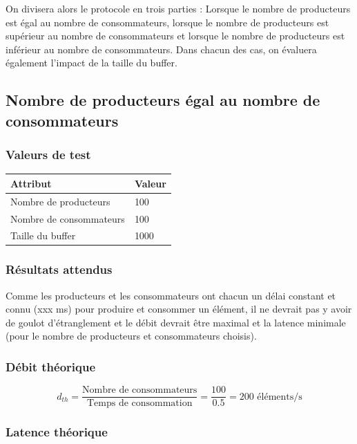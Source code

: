 \documentclass[
  french,
  a4paper,
]{scrartcl}
\begin{document}
On divisera alors le protocole en trois parties : Lorsque le nombre de producteurs est égal 
au nombre de consommateurs, lorsque le nombre de producteurs est supérieur au nombre de consommateurs
et lorsque le nombre de producteurs est inférieur au nombre de consommateurs. Dans chacun des cas, 
on évaluera également l'impact de la taille du buffer. 

\subsection{Nombre de producteurs égal au nombre de consommateurs}

\subsubsection*{Valeurs de test}

\begin{table}[h]
  \centering
  \begin{tabular}{l|l}
    \textbf{Attribut}  & \textbf{Valeur} \\
    \hline
    Nombre de producteurs & 100 \\
    Nombre de consommateurs & 100 \\
    Taille du buffer & 1000 \\
  \end{tabular}
\end{table}

\subsubsection*{Résultats attendus}

Comme les producteurs et les consommateurs ont chacun un délai constant et connu (xxx ms) pour 
produire et consommer un élément, il ne devrait pas y avoir de goulot d'étranglement et le débit 
devrait être maximal et la latence minimale (pour le nombre de producteurs et consommateurs choisis).

\subsubsection*{Débit théorique}

$$
d_{th} = \frac{\text{Nombre de consommateurs}}{\text{Temps de consommation}} = \frac{100}{0.5} = 200 \text{ éléments/s}
$$

\subsubsection*{Latence théorique}
\end{document}
